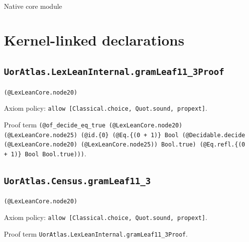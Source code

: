 \documentclass[11pt]{article}
\begin{document}
\begin{center}{\LARGE Native core module}\end{center}
\section*{Kernel-linked declarations}
\subsection*{\texttt{UorAtlas.LexLeanInternal.gramLeaf11\_3Proof}}
\noindent\texttt{(@LexLeanCore.node20)}\par
\noindent Axiom policy: \texttt{allow [Classical.choice, Quot.sound, propext]}.\par
\noindent Proof term \texttt{(@of\_decide\_eq\_true (@LexLeanCore.node20) (@LexLeanCore.node25) (@id.\{0\} (@Eq.\{(0 + 1)\} Bool (@Decidable.decide (@LexLeanCore.node20) (@LexLeanCore.node25)) Bool.true) (@Eq.refl.\{(0 + 1)\} Bool Bool.true)))}.\par
\subsection*{\texttt{UorAtlas.Census.gramLeaf11\_3}}
\noindent\texttt{(@LexLeanCore.node20)}\par
\noindent Axiom policy: \texttt{allow [Classical.choice, Quot.sound, propext]}.\par
\noindent Proof term \texttt{UorAtlas.LexLeanInternal.gramLeaf11\_3Proof}.\par
\end{document}
